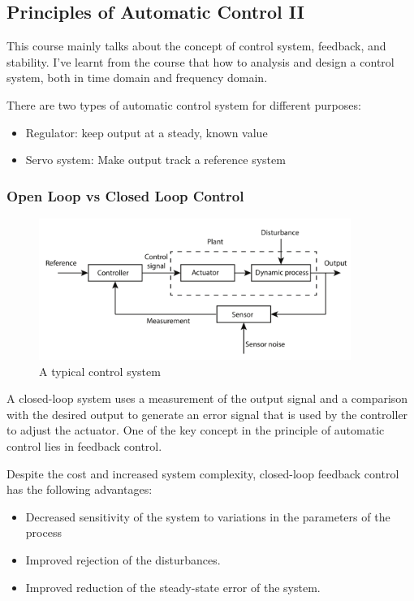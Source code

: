 
\subsection{Principles of Automatic Control II}
This course mainly talks about the concept of control system, feedback, and stability. I've learnt from the course that how to analysis and design a control system, both in time domain and frequency domain.

There are two types of automatic control system for different purposes:
\begin{itemize}
  \item Regulator: keep output at a steady, known value
  \item Servo system: Make output track a reference system
\end{itemize}

\subsubsection{Open Loop vs Closed Loop Control}

\begin{figure}
  \centering
  \includegraphics[width=4in]{fig/800px-Feedback_loop_with_descriptions.svg.png}
  \caption{A typical control system}\label{fig_control_loop}
\end{figure}

A closed-loop system uses a measurement of the output signal and a comparison with the desired output to generate an error signal that is used by the controller to adjust the actuator. One of the key concept in the principle of automatic control lies in feedback control.

Despite the cost and increased system complexity, closed-loop feedback control has the following advantages:
\begin{itemize}
  \item Decreased sensitivity of the system to variations in the parameters of the process
  \item Improved rejection of the disturbances.
  \item Improved reduction of the steady-state error of the system.
\end{itemize}

